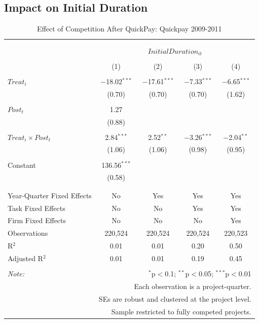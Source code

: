 \documentclass[
]{article}
\begin{document}
\hypertarget{impact-on-initial-duration}{%
\subsection{Impact on Initial
Duration}\label{impact-on-initial-duration}}

\begin{table}[H] \centering 
  \caption{Effect of Competition After QuickPay: Quickpay 2009-2011} 
  \label{} 
\small 
\begin{tabular}{@{\extracolsep{-2pt}}lcccc} 
\\[-1.8ex]\hline 
\hline \\[-1.8ex] 
\\[-1.8ex] & \multicolumn{4}{c}{$InitialDuration_{it}$} \\ 
\\[-1.8ex] & (1) & (2) & (3) & (4)\\ 
\hline \\[-1.8ex] 
 $Treat_i$ & $-$18.02$^{***}$ & $-$17.61$^{***}$ & $-$7.33$^{***}$ & $-$6.65$^{***}$ \\ 
  & (0.70) & (0.70) & (0.70) & (1.62) \\ 
  & & & & \\ 
 $Post_t$ & 1.27 &  &  &  \\ 
  & (0.88) &  &  &  \\ 
  & & & & \\ 
 $Treat_i \times Post_t$ & 2.84$^{***}$ & 2.52$^{**}$ & $-$3.26$^{***}$ & $-$2.04$^{**}$ \\ 
  & (1.06) & (1.06) & (0.98) & (0.95) \\ 
  & & & & \\ 
 Constant & 136.56$^{***}$ &  &  &  \\ 
  & (0.58) &  &  &  \\ 
  & & & & \\ 
\hline \\[-1.8ex] 
Year-Quarter Fixed Effects & No & Yes & Yes & Yes \\ 
Task Fixed Effects & No & No & Yes & Yes \\ 
Firm Fixed Effects & No & No & No & Yes \\ 
Observations & 220,524 & 220,524 & 220,524 & 220,523 \\ 
R$^{2}$ & 0.01 & 0.01 & 0.20 & 0.50 \\ 
Adjusted R$^{2}$ & 0.01 & 0.01 & 0.19 & 0.45 \\ 
\hline 
\hline \\[-1.8ex] 
\textit{Note:}  & \multicolumn{4}{r}{$^{*}$p$<$0.1; $^{**}$p$<$0.05; $^{***}$p$<$0.01} \\ 
 & \multicolumn{4}{r}{Each observation is a project-quarter.} \\ 
 & \multicolumn{4}{r}{SEs are robust and clustered at the project level.} \\ 
 & \multicolumn{4}{r}{Sample restricted to fully competed projects.} \\ 
\end{tabular} 
\end{table}
\end{document}
